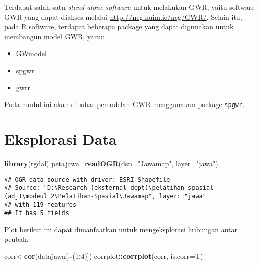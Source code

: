 \documentclass[
]{book}
\newenvironment{Shaded}{\begin{snugshade}}{\end{snugshade}}
\newcommand{\DataTypeTok}[1]{\textcolor[rgb]{0.13,0.29,0.53}{#1}}
\newcommand{\DecValTok}[1]{\textcolor[rgb]{0.00,0.00,0.81}{#1}}
\newcommand{\KeywordTok}[1]{\textcolor[rgb]{0.13,0.29,0.53}{\textbf{#1}}}
\newcommand{\NormalTok}[1]{#1}
\newcommand{\OperatorTok}[1]{\textcolor[rgb]{0.81,0.36,0.00}{\textbf{#1}}}
\newcommand{\StringTok}[1]{\textcolor[rgb]{0.31,0.60,0.02}{#1}}
\begin{document}
Terdapat salah satu \emph{stand-alone software} untuk melakukan GWR, yaitu software GWR yang dapat diakses melalui \url{http://ncg.nuim.ie/ncg/GWR/}. Selain itu, pada R software, terdapat beberapa package yang dapat digunakan untuk membangun model GWR, yaitu:

\begin{itemize}
\item
  GWmodel
\item
  spgwr
\item
  gwrr
\end{itemize}

Pada modul ini akan dibahas pemodelan GWR menggunakan package \texttt{spgwr}.

\hypertarget{eksplorasi-data-1}{%
\section{Eksplorasi Data}\label{eksplorasi-data-1}}

\begin{Shaded}
\begin{Highlighting}[]
\KeywordTok{library}\NormalTok{(rgdal)}
\NormalTok{petajawa=}\KeywordTok{readOGR}\NormalTok{(}\DataTypeTok{dsn=}\StringTok{"Jawamap"}\NormalTok{, }\DataTypeTok{layer=}\StringTok{"jawa"}\NormalTok{)}
\end{Highlighting}
\end{Shaded}

\begin{verbatim}
## OGR data source with driver: ESRI Shapefile 
## Source: "D:\Research (eksternal dept)\pelatihan spasial (adj)\modeul 2\Pelatihan-Spasial\Jawamap", layer: "jawa"
## with 119 features
## It has 5 fields
\end{verbatim}

\begin{Shaded}
\end{Shaded}

Plot berikut ini dapat dimanfaatkan untuk mengeksplorasi hubungan antar peubah.

\begin{Shaded}
\begin{Highlighting}[]
\NormalTok{corr\textless{}{-}}\KeywordTok{cor}\NormalTok{(datajawa[,}\OperatorTok{{-}}\NormalTok{(}\DecValTok{1}\OperatorTok{:}\DecValTok{4}\NormalTok{)])}
\NormalTok{corrplot}\OperatorTok{::}\KeywordTok{corrplot}\NormalTok{(corr, }\DataTypeTok{is.corr=}\NormalTok{T)}
\end{Highlighting}
\end{Shaded}
\end{document}
